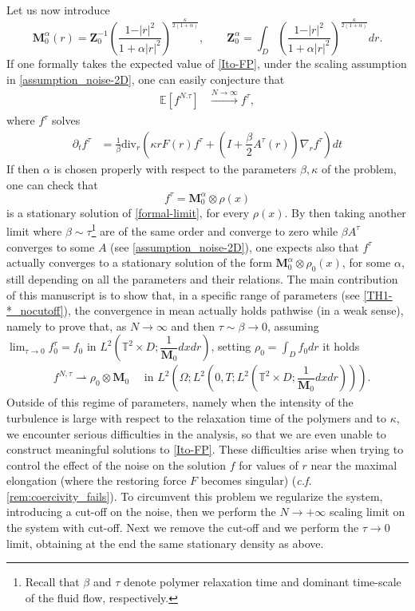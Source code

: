 \documentclass[a4paper,12pt, reqno]{amsart}
\newcommand{\T}{\mathbb{T}}
\newcommand{\EE}[1]{\mathbb{E}\left[#1\right]}
\newcommand{\M}{\mathbf{M}}
\renewcommand{\k}{\kappa}
\newcommand{\Div}{\text{div}}
\begin{document}
 Let us now introduce 
 $$\M^\alpha_0 (r) = \mathbf{Z}_0^{-1} \left(
\dfrac{1 - \vert r\vert^{2}}{1 + \alpha \vert r\vert^{2}}
\right)^{\frac{\kappa}{2\left(1 + \alpha\right)}}, \qquad \mathbf{Z}^\alpha_0=\int_D \left(
\dfrac{1 - \vert r\vert^{2}}{1 + \alpha \vert r\vert^{2}}
\right)^{\frac{\kappa}{2\left(1 + \alpha\right)}} dr
.$$
If one formally takes the expected value of \eqref{Ito-FP}, under the scaling assumption in \autoref{assumption_noise-2D}, one can easily conjecture that 
\begin{align*}
    \EE{f^{N. \tau}} &\xrightarrow[]{N\rightarrow\infty} f^\tau, \end{align*}
where $f^\tau$ solves
    \begin{align}\label{formal-limit}
    \partial_t f^\tau &= \frac{1}{\beta}\Div_r \left(\k r F(r)f^{\tau}+	\left(I +\dfrac{\beta}{2}  A^{\tau}(r) \right)\nabla_rf^{\tau}\right)dt 
\end{align} 
If then $\alpha$ is chosen properly with respect to the parameters $\beta, \kappa$ of the problem, one can check that  $$f^\tau=\M_0^\alpha\otimes \rho(x)$$ is a stationary solution of \eqref{formal-limit}, for every $\rho(x)$. By then taking another limit where $\beta \sim \tau $\footnote{Recall that $\beta$  and $\tau$ denote polymer relaxation time and dominant time-scale of the fluid flow, respectively.} are of the same order and converge to zero while $\beta A^\tau$ converges to some $A$ (see \autoref{assumption_noise-2D}), one expects also that $f^\tau$ actually converges to a stationary solution of the form $\M_0^\alpha \otimes \rho_0(x)$, for some $\alpha$, still depending on all the parameters and their relations.
The main contribution of this manuscript is to show that, in a specific range of parameters (see \autoref{TH1-*_nocutoff}), the convergence in mean actually holds pathwise (in a weak sense), namely to prove that, as $N\to \infty$ and then $\tau\sim  \beta\to 0$, assuming $\displaystyle\lim_{\tau\to 0} f^\tau_0=f_0 \text{ in } L^2(\T^2\times D; \dfrac{1}{\mathbf{M}_0}dxdr)$, setting $\rho_0=\int_Df_0dr $ it holds
 \begin{align*}
   &f^{N,\tau}   \rightharpoonup \rho_0\otimes\mathbf{M}_0  \quad \text{ in }  L^2(\Omega;L^2(0,T;L^2(\T^2\times D; \dfrac{1}{\mathbf{M}_0}dxdr))).
 \end{align*} 
Outside of this regime of parameters, namely when the intensity of the turbulence is large with respect to the relaxation time of the polymers and to $\kappa$, we encounter serious difficulties in the analysis, so that we are even unable to construct meaningful solutions to \eqref{Ito-FP}. These difficulties arise when trying to control the effect of the noise on the solution $f$ for values of $r$ near the maximal elongation (where the restoring force $F$ becomes singular) (\textit{c.f.} \autoref{rem:coercivity_fails}). To circumvent this problem we regularize the system, introducing a cut-off on the noise, then we perform the $N\rightarrow +\infty$ scaling limit on the system with cut-off. Next we remove the cut-off and we perform the $\tau \rightarrow 0$ limit, obtaining at the end the same stationary density as above.  
\end{document}
